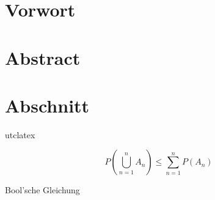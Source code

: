 








\blankpage


\setcounter{page}{-1}
\thispagestyle{empty}



\clearpage



\section*{Vorwort}

\clearpage



\section*{Abstract}

\clearpage






\section{Abschnitt}\label{sec:first}

\lipsum[1-5]\cite{biblatex}\acrshort{utc}\gls{latex}

\begin{mycapequ}[!ht]
    \begin{equation}
        {P(\bigcup_{n=1}^n A_n) \leq \sum_{n=1}^n P(A_n)}
        \label{eq:bool1} %
    \end{equation}
    \caption{Bool'sche Gleichung}
\end{mycapequ}

